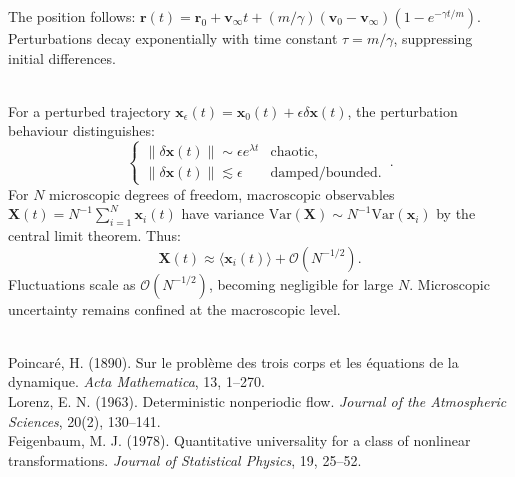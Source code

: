 \begin{technical}
The position follows: $\mathbf{r}(t) = \mathbf{r}_0 + \mathbf{v}_\infty t + (m/\gamma)(\mathbf{v}_0 - \mathbf{v}_\infty)(1 - e^{-\gamma t/m})$. Perturbations decay exponentially with time constant $\tau = m/\gamma$, suppressing initial differences.

\\
For a perturbed trajectory $\mathbf{x}_\epsilon(t) = \mathbf{x}_0(t) + \epsilon \delta \mathbf{x}(t)$, the perturbation behaviour distinguishes:
\[
\begin{cases}
\|\delta \mathbf{x}(t)\| \sim \epsilon e^{\lambda t} & \text{chaotic,} \\[0.5em]
\|\delta \mathbf{x}(t)\| \lesssim \epsilon & \text{damped/bounded.}
\end{cases}\,.
\]
For $N$ microscopic degrees of freedom, macroscopic observables $\mathbf{X}(t) = N^{-1} \sum_{i=1}^N \mathbf{x}_i(t)$ have variance $\mathrm{Var}(\mathbf{X}) \sim N^{-1} \mathrm{Var}(\mathbf{x}_i)$ by the central limit theorem. Thus:
\[
\mathbf{X}(t) \approx \langle \mathbf{x}_i(t) \rangle + \mathcal{O}(N^{-1/2}).
\]
Fluctuations scale as $\mathcal{O}(N^{-1/2})$, becoming negligible for large $N$. Microscopic uncertainty remains confined at the macroscopic level.

\techref
{\footnotesize  \\
Poincaré, H. (1890). Sur le problème des trois corps et les équations de la dynamique. \textit{Acta Mathematica}, 13, 1–270.\\
Lorenz, E. N. (1963). Deterministic nonperiodic flow. \textit{Journal of the Atmospheric Sciences}, 20(2), 130–141.\\
Feigenbaum, M. J. (1978). Quantitative universality for a class of nonlinear transformations. \textit{Journal of Statistical Physics}, 19, 25–52.
}
\end{technical}
